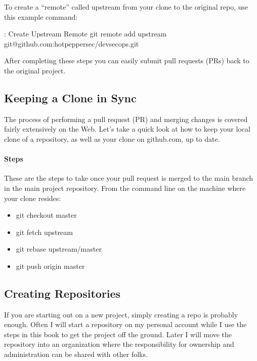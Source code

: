 To create a ``remote'' called upstream from your clone to the original
repo, use this example command:

\begin{mybox}{\thetcbcounter: Create Upstream Remote}
git remote add upstream git@github.com:hotpeppersec/devsecops.git
\end{mybox}
\justify{}
After completing these steps you can easily submit pull requests (PRs)
back to the original project.

\hypertarget{keeping-a-clone-in-sync}{%
      \subsection{Keeping a Clone in Sync}\label{keeping-a-clone-in-sync}}

\justify{}
The process of performing a pull request (PR) and merging changes is
covered fairly extensively on the Web. Let's take a quick look at how to
keep your local clone of a repository, as well as your clone on
github.com, up to date.

\hypertarget{steps-1}{%
      \paragraph{Steps}\label{steps-1}}

\justify{}
These are the steps to take once your pull request is merged to the main
branch in the main project repository. From the command line on the
machine where your clone resides:

\begin{itemize}
      \item
            git checkout master
      \item
            git fetch upstream
      \item
            git rebase upstream/master
      \item
            git push origin master
\end{itemize}
\subsection{Creating Repositories}
\justify{}
If you are starting out on a new project, simply creating a repo is
probably enough. Often I will start a repository on my personal account
while I use the steps in this book to get the project off the ground.
Later I will move the repository into an organization where the
responsibility for ownership and administration can be shared with other
folks.


